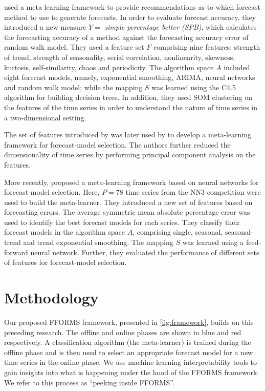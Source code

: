 \documentclass[11pt,a4paper,]{article}
\begin{document}
\textcite{wang2009rule} used a meta-learning framework to provide recommendations as to which forecast method to use to generate forecasts. In order to evaluate forecast accuracy, they introduced a new measure \(Y =\) \emph{simple percentage better (SPB)}, which calculates the forecasting accuracy of a method against the forecasting accuracy error of random walk model. They used a feature set \(F\) comprising nine features: strength of trend, strength of seasonality, serial correlation, nonlinearity, skewness, kurtosis, self-similarity, chaos and periodicity. The algorithm space \(A\) included eight forecast models, namely, exponential smoothing, ARIMA, neural networks and random walk model; while the mapping \(S\) was learned using the C4.5 algorithm for building decision trees. In addition, they used SOM clustering on the features of the time series in order to understand the nature of time series in a two-dimensional setting.

The set of features introduced by \textcite{wang2009rule} was later used by \textcite{widodomodel} to develop a meta-learning framework for forecast-model selection. The authors further reduced the dimensionality of time series by performing principal component analysis on the features.

More recently, \textcite{kuck2016meta} proposed a meta-learning framework based on neural networks for forecast-model selection. Here, \(P = 78\) time series from the NN3 competition were used to build the meta-learner. They introduced a new set of features based on forecasting errors. The average symmetric mean absolute percentage error was used to identify the best forecast models for each series. They classify their forecast models in the algorithm space \(A\), comprising single, seasonal, seasonal-trend and trend exponential smoothing. The mapping \(S\) was learned using a feed-forward neural network. Further, they evaluated the performance of different sets of features for forecast-model selection.

\hypertarget{fforms}{%
\section{Methodology}\label{fforms}}

Our proposed FFORMS framework, presented in \autoref{fig:framework}, builds on this preceding research. The offline and online phases are shown in blue and red respectively. A classification algorithm (the meta-learner) is trained during the offline phase and is then used to select an appropriate forecast model for a new time series in the online phase. We use machine learning interpretability tools to gain insights into what is happening under the hood of the FFORMS framework. We refer to this process as ``peeking inside FFORMS''.
\end{document}

